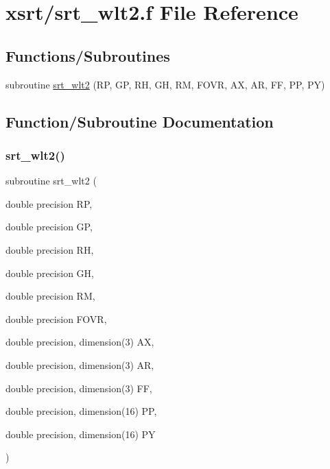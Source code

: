 \hypertarget{srt__wlt2_8f}{}\section{xsrt/srt\+\_\+wlt2.f File Reference}
\label{srt__wlt2_8f}
\subsection*{Functions/\+Subroutines}
\begin{DoxyCompactItemize}
\item 
subroutine \hyperlink{srt__wlt2_8f_a652e0e86306ff63a8847a63760d0a6c6}{srt\+\_\+wlt2} (RP, GP, RH, GH, RM, F\+O\+VR, AX, AR, FF, PP, PY)
\end{DoxyCompactItemize}


\subsection{Function/\+Subroutine Documentation}
\mbox{\label{srt__wlt2_8f_a652e0e86306ff63a8847a63760d0a6c6}} 
\subsubsection{\texorpdfstring{srt\+\_\+wlt2()}{srt\_wlt2()}}
{\footnotesize\ttfamily subroutine srt\+\_\+wlt2 (\begin{DoxyParamCaption}\item[{double precision}]{RP,  }\item[{double precision}]{GP,  }\item[{double precision}]{RH,  }\item[{double precision}]{GH,  }\item[{double precision}]{RM,  }\item[{double precision}]{F\+O\+VR,  }\item[{double precision, dimension(3)}]{AX,  }\item[{double precision, dimension(3)}]{AR,  }\item[{double precision, dimension(3)}]{FF,  }\item[{double precision, dimension(16)}]{PP,  }\item[{double precision, dimension(16)}]{PY }\end{DoxyParamCaption})}

